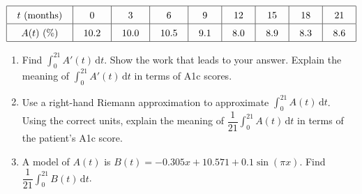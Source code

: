  \begin{align*}
    \arraycolsep=11pt\def\arraystretch{1.5}
    \begin{array}{|c|c|c|c|c|c|c|c|c|}
        \hline
        t \text{ (months)} &  0 & 3 & 6 & 9 & 12 & 15 & 18 & 21 \\ \hline
        A(t) \text{ (\%)} & 10.2 & 10.0 & 10.5 & 9.1 & 8.0 & 8.9 & 8.3 & 8.6 \\
        \hline 
    \end{array}
\end{align*} 
\begin{enumerate}[label=\hspace{11pt}(\alph*), align=left, leftmargin=*, labelsep=0.25em]
    \item Find $\int_0^{21} A'(t) \,\mathrm{d}t$. Show the work that leads to your answer. Explain the meaning of $\int_0^{21} A'(t) \,\mathrm{d}t$ in terms of A1c scores. 
    \item Use a right-hand Riemann approximation to approximate $\int_0^{21} A(t) \,\mathrm{d}t$. Using the correct units, explain the meaning of $\dfrac{1}{21}\int_0^{21} A(t) \,\mathrm{d}t$ in terms of the patient's A1c score.
    \item A model of $A(t)$ is $B(t) = -0.305x + 10.571 + 0.1\sin(\pi x)$. Find $\dfrac{1}{21}\int_0^{21} B(t) \,\mathrm{d}t$.
\end{enumerate} \vspace{11pt}

